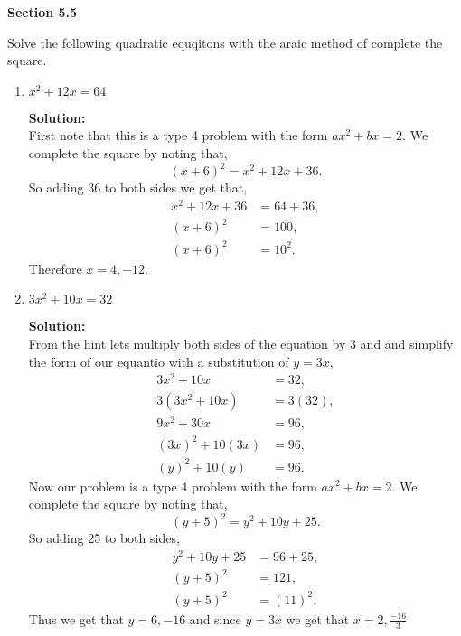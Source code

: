 \documentclass[12pt]{article}
\makeatletter
\theoremstyle{homework}
\newenvironment{exercise}[1]
{\def\@currentlabel{#1}\exercisecore}
{\endexercisecore}
\newcommand{\localhead}[1]{\par\smallskip\noindent\textbf{#1}\nobreak\\}%
\newcommand\solution{\localhead{Solution:}}
\makeatother
\begin{document}
\textbf{Section 5.5}

\begin{exercise}{1} Solve the following quadratic equqitons with the araic method of complete the square.\\
  \begin{enumerate}
    \item $x^2 + 12x = 64$\\
    \solution First note that this is a type 4 problem with the form $ax^2 + bx = 2$. We complete the square by noting that, 
    \begin{equation*}
      (x + 6)^2 = x^2 + 12x + 36. 
    \end{equation*}
    So adding 36 to both sides we get that,
    \begin{align*}
      x^2 + 12x + 36 &= 64 + 36,\\
      (x + 6)^2 &= 100,\\
      (x + 6)^2 &= 10^2.
    \end{align*}
    Therefore $x = 4, -12$. 
    \vspace{.25in}

    \item $3x^2 + 10x = 32$\\
    \solution From the hint lets multiply both sides of the equation by 3 and and simplify the form of our equantio with a substitution of $y = 3x$, 
    \begin{align*}
      3x^2 + 10x &= 32,\\
      3(3x^2 + 10x) &= 3(32),\\
      9x^2 + 30x &= 96,\\
      (3x)^2 + 10(3x) &= 96,\\
      (y)^2 + 10(y) &= 96.
    \end{align*}
    Now our problem is a type 4 problem with the form $ax^2 + bx = 2$. We complete the square by noting that, 
    \begin{equation*}
      (y + 5)^2 = y^2 + 10y + 25. 
    \end{equation*}
    So adding 25 to both sides, 
    \begin{align*}
      y^2 + 10y + 25 &= 96 + 25,\\
      (y + 5)^2 &= 121,\\
      (y + 5)^2 &= (11)^2.
    \end{align*}
    Thus we get that $y = 6, -16$ and since $y = 3x$ we get that $x = 2, \frac{-16}{3}$
    \vspace{.25in}


  \end{enumerate}
\end{exercise}
\vspace{.5in}
\end{document}
